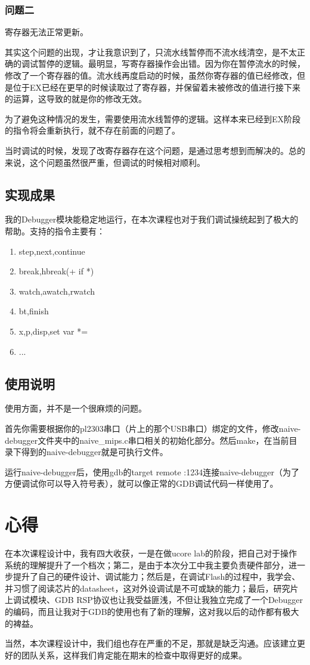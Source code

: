 \subsubsection{问题二}
寄存器无法正常更新。

其实这个问题的出现，才让我意识到了，只流水线暂停而不流水线清空，是不太正确的调试暂停的逻辑。最明显，写寄存器操作会出错。因为你在暂停流水的时候，修改了一个寄存器的值。流水线再度启动的时候，虽然你寄存器的值已经修改，但是位于EX已经在更早的时候读取过了寄存器，并保留着未被修改的值进行接下来的运算，这导致的就是你的修改无效。

为了避免这种情况的发生，需要使用流水线暂停的逻辑。这样本来已经到EX阶段的指令将会重新执行，就不存在前面的问题了。

当时调试的时候，发现了改寄存器存在这个问题，是通过思考想到而解决的。总的来说，这个问题虽然很严重，但调试的时候相对顺利。

\subsection{实现成果}
我的Debugger模块能稳定地运行，在本次课程也对于我们调试操统起到了极大的帮助。支持的指令主要有：
\begin{enumerate}
\item step,next,continue
\item break,hbreak(+ if *)
\item watch,awatch,rwatch
\item bt,finish
\item x,p,disp,set var *=
\item ...
\end{enumerate}

\subsection{使用说明}
使用方面，并不是一个很麻烦的问题。

首先你需要根据你的pl2303串口（片上的那个USB串口）绑定的文件，修改naive-debugger文件夹中的naive\_mips.c串口相关的初始化部分。然后make，在当前目录下得到的naive-debugger就是可执行文件。

运行naive-debugger后，使用gdb的target remote :1234连接naive-debugger（为了方便调试你可以导入符号表），就可以像正常的GDB调试代码一样使用了。




\section{心得}
在本次课程设计中，我有四大收获，一是在做ucore lab的阶段，把自己对于操作系统的理解提升了一个档次；第二，是由于本次分工中我主要负责硬件部分，进一步提升了自己的硬件设计、调试能力；然后是，在调试Flash的过程中，我学会、并习惯了阅读芯片的datasheet，这对外设调试是不可或缺的能力；最后，研究片上调试模块、GDB RSP协议也让我受益匪浅，不但让我独立完成了一个Debugger的编码，而且让我对于GDB的使用也有了新的理解，这对我以后的动作都有极大的裨益。

当然，本次课程设计中，我们组也存在严重的不足，那就是缺乏沟通。应该建立更好的团队关系，这样我们肯定能在期末的检查中取得更好的成果。
